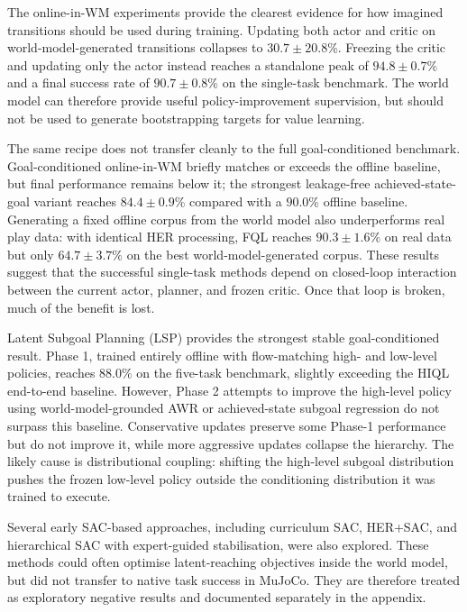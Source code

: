 The online-in-WM experiments provide the clearest evidence for how
imagined transitions should be used during training. Updating both actor
and critic on world-model-generated transitions collapses to
$30.7 \pm 20.8\%$. Freezing the critic and updating only the actor
instead reaches a standalone peak of $94.8 \pm 0.7\%$ and a final
success rate of $90.7 \pm 0.8\%$ on the single-task benchmark. The
world model can therefore provide useful policy-improvement
supervision, but should not be used to generate bootstrapping targets
for value learning.

The same recipe does not transfer cleanly to the full
goal-conditioned benchmark. Goal-conditioned online-in-WM briefly
matches or exceeds the offline baseline, but final performance remains
below it; the strongest leakage-free achieved-state-goal variant reaches
$84.4 \pm 0.9\%$ compared with a $90.0\%$ offline baseline. Generating a
fixed offline corpus from the world model also underperforms real play
data: with identical HER processing, FQL reaches $90.3 \pm 1.6\%$ on
real data but only $64.7 \pm 3.7\%$ on the best world-model-generated
corpus. These results suggest that the successful single-task methods
depend on closed-loop interaction between the current actor, planner,
and frozen critic. Once that loop is broken, much of the benefit is
lost.

Latent Subgoal Planning (LSP) provides the strongest stable
goal-conditioned result. Phase 1, trained entirely offline with
flow-matching high- and low-level policies, reaches $88.0\%$ on the
five-task benchmark, slightly exceeding the HIQL end-to-end baseline.
However, Phase 2 attempts to improve the high-level policy using
world-model-grounded AWR or achieved-state subgoal regression do not
surpass this baseline. Conservative updates preserve some Phase-1
performance but do not improve it, while more aggressive updates
collapse the hierarchy. The likely cause is distributional coupling:
shifting the high-level subgoal distribution pushes the frozen low-level
policy outside the conditioning distribution it was trained to execute.

Several early SAC-based approaches, including curriculum SAC, HER+SAC,
and hierarchical SAC with expert-guided stabilisation, were also
explored. These methods could often optimise latent-reaching objectives
inside the world model, but did not transfer to native task success in
MuJoCo. They are therefore treated as exploratory negative results and
documented separately in the appendix.

